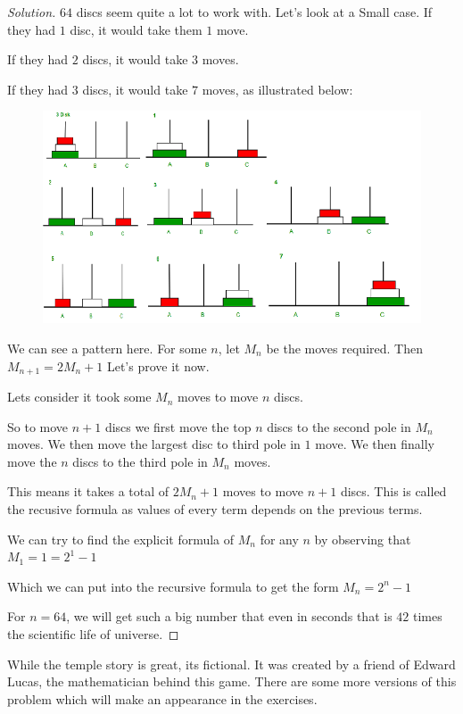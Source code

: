 \begin{proof}
    [Solution]
    $64$ discs seem quite a lot to work with. Let's look at a Small case.
    If they had $1$ disc, it would take them $1$ move.\par
    If they had $2$ discs, it would take $3$ moves.\par
    If they had $3$ discs, it would take $7$ moves, as illustrated below:\par
    \begin{figure}[H]
        \centering
        \includegraphics[width=0.5\linewidth]{Tower of hanoi at n=3.png}
    \end{figure}
    We can see a pattern here. For some $n$, let $M_n$ be the moves required. 
    Then $M_{n+1}=2M_{n}+1$ Let's prove it now.\par
    Lets consider it took some $M_n$ moves to move $n$ discs.\par
    So to move $n+1$ discs we first move the top $n$ discs to the second pole in 
    $M_n$ moves. We then move the largest disc to third pole in $1$ move. We then finally move the 
    $n$ discs to the third pole in $M_n$ moves.\par
    This means it takes a total of $2M_n+1$ moves to move $n+1$ discs. 
    This is called the recusive formula as values of every term depends on the previous terms.\par
    We can try to find the explicit formula of $M_n$ for any $n$ by observing that $M_1=1=2^1-1$\par
    Which we can put into the recursive formula to get the form $M_n=2^n-1$\par
    For $n=64$, we will get such a big number that even in seconds that is $42$ times the 
    scientific life of universe.
\end{proof}
While the temple story is great, its fictional. It was created by a friend of Edward Lucas, 
the mathematician behind this game. There are some more versions of this problem which will 
make an appearance in the exercises.
